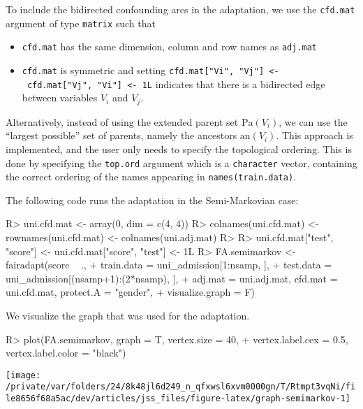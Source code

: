 \documentclass[
  notitle]{jss}
\providecommand{\tightlist}{%
  \setlength{\itemsep}{0pt}\setlength{\parskip}{0pt}}
\begin{document}
To include the bidirected confounding arcs in the adaptation, we use the
\texttt{cfd.mat} argument of type \texttt{matrix} such that

\begin{itemize}
\tightlist
\item
  \texttt{cfd.mat} has the same dimension, column and row names as
  \texttt{adj.mat}
\item
  \texttt{cfd.mat} is symmetric and setting
  \texttt{cfd.mat{[}"Vi",\ "Vj"{]}\ \textless{}-\ cfd.mat{[}"Vj",\ "Vi"{]}\ \textless{}-\ 1L}
  indicates that there is a bidirected edge between variables \(V_i\)
  and \(V_j\).
\end{itemize}

Alternatively, instead of using the extended parent set
\(\mathrm{Pa}(V_i)\), we can use the ``largest possible'' set of
parents, namely the ancestors \(\mathrm{an}(V_i)\). This approach is
implemented, and the user only needs to specify the topological
ordering. This is done by specifying the \texttt{top.ord} argument which
is a \texttt{character} vector, containing the correct ordering of the
names appearing in \texttt{names(train.data)}.

The following code runs the adaptation in the Semi-Markovian case:

\begin{CodeChunk}
\begin{CodeInput}
R> uni.cfd.mat <- array(0, dim = c(4, 4))
R> colnames(uni.cfd.mat) <- rownames(uni.cfd.mat) <- colnames(uni.adj.mat)
R> 
R> uni.cfd.mat["test", "score"] <- uni.cfd.mat["score", "test"] <- 1L
R> FA.semimarkov <- fairadapt(score ~ .,
+   train.data = uni_admission[1:nsamp, ],
+   test.data = uni_admission[(nsamp+1):(2*nsamp), ],
+   adj.mat = uni.adj.mat, cfd.mat = uni.cfd.mat, protect.A = "gender",
+   visualize.graph = F)
\end{CodeInput}
\end{CodeChunk}

We visualize the graph that was used for the adaptation.

\begin{CodeChunk}
\begin{CodeInput}
R> plot(FA.semimarkov, graph = T, vertex.size = 40,
+   vertex.label.cex = 0.5, vertex.label.color = "black")
\end{CodeInput}


\begin{center}\texttt{[image: /private/var/folders/24/8k48jl6d249\_n\_qfxwsl6xvm0000gn/T/Rtmpt3vqNi/file8656f68a5ac/dev/articles/jss\_files/figure-latex/graph-semimarkov-1]} \end{center}

\end{CodeChunk}
\end{document}
